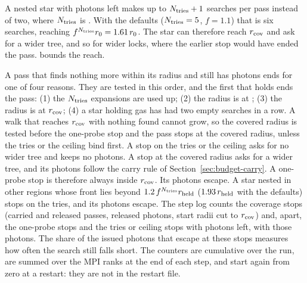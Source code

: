 A nested star with photons left makes up to $N_{\rm tries}+1$ searches per pass
instead of two, where $N_{\rm tries}$ is
. With the defaults
($N_{\rm tries}=5$, $f=1.1$) that is six searches, reaching
$f^{N_{\rm tries}} r_0 = 1.61\,r_0$. The star can therefore reach $r_{\rm cov}$
and ask for a wider tree, and so for wider locks, where the earlier stop would
have ended the pass.  bounds the reach.

A pass that finds nothing more within its radius and still has photons ends
for one of four reasons. They are tested in this order, and the first that
holds ends the pass: (1) the $N_{\rm tries}$ expansions are used up; (2) the
radius is at ; (3) the radius is at
$r_{\rm cov}$; (4) a star holding gas has had two empty searches in a row. A
walk that reaches $r_{\rm cov}$ with nothing found cannot grow, so the covered
radius is tested before the one-probe stop and the pass stops at the covered
radius, unless the tries or the ceiling bind first. A stop on the tries or the
ceiling asks for no wider tree and keeps no photons. A stop at the covered
radius asks for a wider tree, and its photons follow the carry rule of
Section~\ref{sec:budget-carry}. A one-probe stop is therefore always inside
$r_{\rm cov}$. Its photons escape. A star nested in other regions whose front
lies beyond $1.2\,f^{N_{\rm tries}} r_{\rm held}$ ($1.93\,r_{\rm held}$ with
the defaults) stops on the tries, and its photons escape. The step log counts
the coverage stops (carried and released passes, released photons, start radii
cut to $r_{\rm cov}$) and, apart, the one-probe stops and the tries or ceiling
stops with photons left, with those photons. The share of the issued photons
that escape at these stops measures how often the search still falls short. The
counters are cumulative over the run, are summed over the MPI ranks at the end
of each step, and start again from zero at a restart: they are not in the
restart file.

